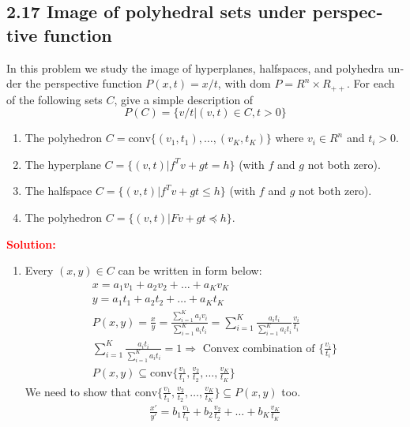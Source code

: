 \documentclass[a4paper]{article}
\begin{document}
\begin{latin}
\section{2.17 Image of polyhedral sets under perspective function}
In this problem we study the image of hyperplanes, halfspaces, and polyhedra under the perspective function $ P(x, t) = x/t $, with dom $ P = R^{n} \times R_{++} $. For each of the following sets $ C $, give a simple description of
\begin{equation*}
	P(C) = \{v/t | (v, t) \in C, t > 0\}
\end{equation*}
\begin{enumerate}
	\item The polyhedron $ C = \text{conv}\{(v_{1}, t_{1}), \dots , (v_{K}, t_{K})\} $ where $ v_{i} \in R^{n}  $ and $ t_{i} > 0 $.
	\item 
	The hyperplane $ C = \{(v, t) | f^{T} v + gt = h\} $ (with $ f $ and $ g $ not both zero).
	\item
	The halfspace $ C = \{(v, t) | f^{T} v + gt \leq h\} $ (with $ f $ and $ g $ not both zero).
	\item 
	The polyhedron $ C = \{(v, t) | Fv + gt \preceq h\} $.	
\end{enumerate}
\textcolor{red}{\textbf{Solution:}}
\begin{enumerate}
	\item
	Every $ (x,y) \in C $ can be written in form below:
	\begin{gather*}
		x = a_{1} v_{1} + a_{2} v_{2} + \dots +  a_{K} v_{K} 
		\\
		y = a_{1} t_{1} + a_{2} t_{2} + \dots +  a_{K} t_{K} 
		\\
		P(x,y) = \frac{x}{y} = \frac{\sum_{i=1}^{K} a_{i} v_{i}}{\sum_{i=1}^{K} a_{i} t_{i}} = \sum_{i=1}^{K} \frac{a_{i} t_{i}}{\sum_{i=1}^{K} a_{i} t_{i}} \frac{v_{i}}{t_{i}}
		\\
		\sum_{i=1}^{K} \frac{a_{i} t_{i}}{\sum_{i=1}^{K} a_{i} t_{i}} = 1 \Rightarrow \text{ Convex combination of } \{\frac{v_{i}}{t_{i}}\}
		\\
		P(x,y) \subseteq \text{conv}\{\frac{v_{1}}{t_{1}}, \frac{v_{2}}{t_{2}}, \dots , \frac{v_{K}}{t_{K}} \}
	\end{gather*}
	We need to show that $ \text{conv}\{\frac{v_{1}}{t_{1}}, \frac{v_{2}}{t_{2}}, \dots , \frac{v_{K}}{t_{K}} \}  \subseteq P(x,y) $ too.
	\begin{gather*}
		\frac{x'}{y'} = b_{1} \frac{v_{1}}{t_{1}} + b_{2} \frac{v_{2}}{t_{2}} + \dots + b_{K} \frac{v_{K}}{t_{K}}
	\end{gather*}

\end{enumerate}
\end{latin}
\end{document}
